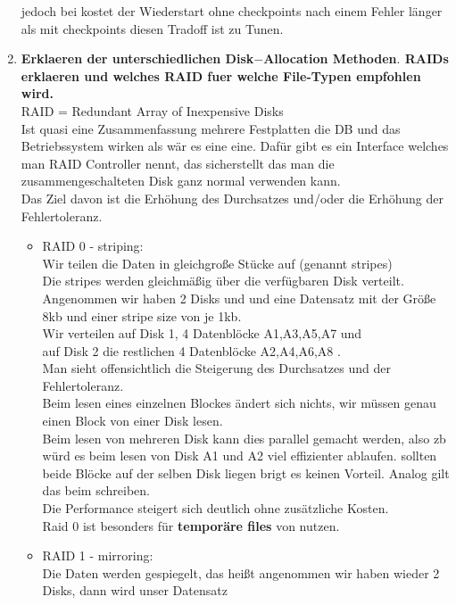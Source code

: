\documentclass[12pt]{article}\pagestyle{myheadings}
\theoremstyle{plain}
\begin{document}
\begin{enumerate}
\begin{itemize}
\end{itemize}
jedoch bei kostet der Wiederstart ohne checkpoints nach einem Fehler länger als mit checkpoints diesen Tradoff ist zu Tunen.
\item \textbf{Erklaeren der unterschiedlichen Disk$-$Allocation Methoden$.$ RAIDs erklaeren und welches RAID fuer welche
File-Typen empfohlen wird.} \\
RAID = Redundant Array of Inexpensive Disks\\
Ist quasi eine Zusammenfassung mehrere Festplatten die DB und das Betriebssystem wirken als wär es eine eine.
Dafür gibt es ein Interface welches man RAID Controller nennt, das sicherstellt das man die zusammengeschalteten Disk ganz normal verwenden kann.\\
Das Ziel davon ist die Erhöhung des Durchsatzes und/oder die Erhöhung der Fehlertoleranz.\\
\begin{itemize}
\item RAID 0 - striping:\\
Wir teilen die Daten in gleichgroße Stücke auf (genannt \textsf{stripes}) \\
Die stripes werden gleichmäßig über die verfügbaren Disk verteilt.\\
Angenommen wir haben 2 Disks und und eine Datensatz mit der Größe 8kb und einer stripe size von je  1kb.\\
Wir verteilen auf Disk 1, 4 Datenblöcke A1,A3,A5,A7 und\\ auf Disk 2 die restlichen 4 Datenblöcke A2,A4,A6,A8 .\\
Man sieht offensichtlich die Steigerung des Durchsatzes und der Fehlertoleranz.\\
Beim lesen eines einzelnen Blockes ändert sich nichts, wir müssen genau einen Block von einer Disk lesen.\\
Beim lesen von mehreren Disk kann dies parallel gemacht werden, also zb würd es beim lesen von Disk A1 und A2 viel effizienter ablaufen. sollten beide Blöcke auf der selben Disk liegen brigt es keinen Vorteil.
Analog gilt das beim schreiben.\\
Die Performance steigert sich deutlich ohne zusätzliche Kosten.\\
Raid 0 ist besonders für \textbf{temporäre files} von nutzen.\\
\item RAID 1 - mirroring:\\
Die Daten werden gespiegelt, das heißt angenommen wir haben wieder 2 Disks, dann wird unser Datensatz\\

\end{itemize}
\end{enumerate}
\end{document}
